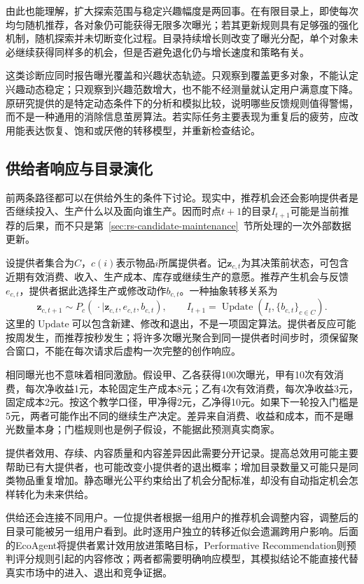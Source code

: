 由此也能理解，扩大探索范围与稳定兴趣幅度是两回事。在有限目录上，即使每次均匀随机推荐，各对象仍可能获得无限多次曝光；若其更新规则具有足够强的强化机制，随机探索并未切断变化过程。目录持续增长则改变了曝光分配，单个对象未必继续获得同样多的机会，但是否避免退化仍与增长速度和策略有关。

这类诊断应同时报告曝光覆盖和兴趣状态轨迹。只观察到覆盖更多对象，不能认定兴趣动态稳定；只观察到兴趣范数增大，也不能不经测量就认定用户满意度下降。原研究提供的是特定动态条件下的分析和模拟比较，说明哪些反馈规则值得警惕，而不是一种通用的消除信息茧房算法。若实际任务主要表现为重复后的疲劳，应改用能表达恢复、饱和或厌倦的转移模型，并重新检查结论。

\subsection{供给者响应与目录演化}
\label{sec:rs-provider-dynamics}

前两条路径都可以在供给外生的条件下讨论。现实中，推荐机会还会影响提供者是否继续投入、生产什么以及面向谁生产。因而时点$t+1$的目录$I_{t+1}$可能是当前推荐的后果，而不只是第~\ref{sec:rs-candidate-maintenance}~节所处理的一次外部数据更新。

设提供者集合为$C$，$c(i)$表示物品$i$所属提供者。记$\bm{z}_{c,t}$为其决策前状态，可包含近期有效消费、收入、生产成本、库存或继续生产的意愿。推荐产生机会与反馈$e_{c,t}$，提供者据此选择生产或修改动作$b_{c,t}$。一种抽象转移关系为
\[
 \bm{z}_{c,t+1}\sim
 P_c(\,\cdot\mid\bm{z}_{c,t},e_{c,t},b_{c,t}),
 \qquad
 I_{t+1}=\operatorname{Update}(I_t,\{b_{c,t}\}_{c\in C}).
\]
这里的$\operatorname{Update}$可以包含新建、修改和退出，不是一项固定算法。提供者反应可能按周发生，而推荐按秒发生；将许多次曝光聚合到同一提供者时间步时，须保留聚合窗口，不能在每次请求后虚构一次完整的创作响应。

相同曝光也不意味着相同激励。假设甲、乙各获得100次曝光，甲有10次有效消费，每次净收益1元，本轮固定生产成本8元；乙有4次有效消费，每次净收益3元，固定成本2元。按这个教学口径，甲净得2元，乙净得10元。如果下一轮投入门槛是5元，两者可能作出不同的继续生产决定。差异来自消费、收益和成本，而不是曝光数量本身；门槛规则也是例子假设，不能据此预测真实商家。

提供者效用、存续、内容质量和内容差异因此需要分开记录。提高总效用可能主要帮助已有大提供者，也可能改变小提供者的退出概率；增加目录数量又可能只是同类物品重复增加。静态曝光公平约束给出了机会分配标准，却没有自动指定机会怎样转化为未来供给。

供给还会连接不同用户。一位提供者根据一组用户的推荐机会调整内容，调整后的目录可能被另一组用户看到。此时逐用户独立的转移近似会遗漏跨用户影响。后面的EcoAgent将提供者累计效用放进策略目标，Performative Recommendation则预判评分规则引起的内容修改；两者都需要明确响应模型，其模拟结论不能直接代替真实市场中的进入、退出和竞争证据。

